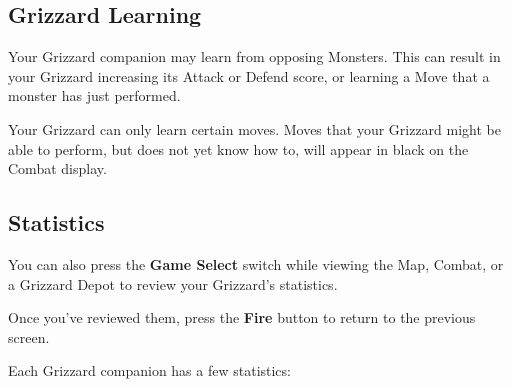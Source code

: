 \documentclass[10pt,twocolumn,openany,article]{memoir}
\begin{document}
\subsection{Grizzard Learning}

Your  Grizzard companion  may  learn from  opposing  Monsters. This  can
result  in your  Grizzard  increasing  its Attack  or  Defend score,  or
learning a Move that a monster has just performed.

Your Grizzard  can only  learn certain moves.  Moves that  your Grizzard
might be able to  perform, but does not yet know how  to, will appear in
black on the Combat display.

\subsection{Statistics}

You can  also press  the \textbf{Game Select}  switch while  viewing the
Map, Combat, or a Grizzard Depot to review your Grizzard's statistics.

Once  you've reviewed  them,  press the  \textbf{Fire} button  to  return to  the
previous screen.

Each Grizzard companion has a few statistics:
\end{document}
